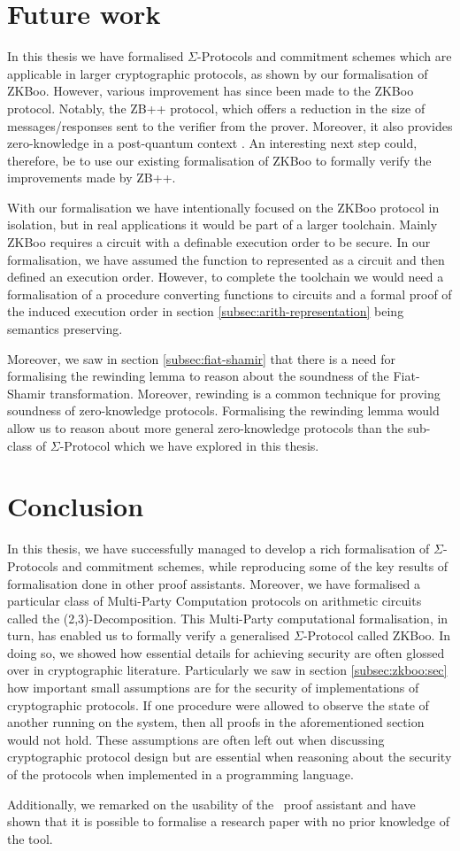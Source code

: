 \section{Future work}
\label{sec:future_work}
In this thesis we have formalised $\Sigma$-Protocols and
commitment schemes which are applicable in larger cryptographic protocols, as shown
by our formalisation of ZKBoo. However, various improvement has since been made to the
ZKBoo protocol. Notably, the ZB++ protocol, which offers a reduction in the
size of messages/responses sent to the verifier from the prover. Moreover, it also provides zero-knowledge
in a post-quantum context \cite{zkb++}. An interesting next step could,
therefore, be to use our existing formalisation of ZKBoo to formally verify the
improvements made by ZB++.

With our formalisation we have intentionally focused on the ZKBoo protocol in
isolation, but in real applications it would be part of a larger toolchain.
Mainly ZKBoo requires a circuit with a definable execution order to be secure.
In our formalisation, we have assumed the function to represented as a circuit
and then defined an execution order. However, to complete the toolchain we would need a formalisation of
a procedure converting functions to circuits and a formal proof of the induced
execution order in section \ref{subsec:arith-representation} being semantics preserving.

Moreover, we saw in section \ref{subsec:fiat-shamir} that there is a need for
formalising the rewinding lemma to reason about the soundness of the Fiat-Shamir
transformation. Moreover, rewinding is a common technique for proving soundness
of zero-knowledge protocols. Formalising the rewinding lemma would allow
us to reason about more general zero-knowledge protocols than the sub-class of
$\Sigma$-Protocol which we have explored in this thesis.

\section{Conclusion}
\label{sec:conclusion}
In this thesis, we have successfully managed to develop a rich formalisation of
$\Sigma$-Protocols and commitment schemes, while reproducing some of the key
results of formalisation done in other proof assistants.
Moreover, we have formalised a particular class of Multi-Party Computation
protocols on arithmetic circuits called the (2,3)-Decomposition.
This Multi-Party computational formalisation, in turn, has enabled us to formally
verify a generalised $\Sigma$-Protocol called ZKBoo.
In doing so, we showed how essential details for achieving security are
often glossed over in cryptographic literature.
Particularly we saw in section \ref{subsec:zkboo:sec} how important small
assumptions are for the security of implementations of cryptographic protocols.
If one procedure were allowed to observe the state of another running on the
system, then all proofs in the aforementioned section would not hold. These
assumptions are often left out when discussing cryptographic protocol design
but are essential when reasoning about the security of the protocols when
implemented in a programming language.

Additionally, we remarked on the usability of the \easycrypt\ proof
assistant and have shown that it is possible to formalise a research paper with
no prior knowledge of the tool.

